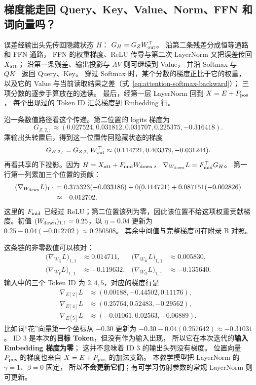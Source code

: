 \subsection{梯度能走回 Query、Key、Value、Norm、FFN 和词向量吗？}
\label{sec:gradient-paths}

误差经输出头先传回隐藏状态 $H$：
$G_H=G_ZW_{\rm out}^\top$。
沿第二条残差分成恒等通路和 FFN 通路，
FFN 的权重梯度、ReLU 传导与第二次 LayerNorm
又把误差传回 $X_{\rm att}$；
沿第一条残差、输出投影与 $AV$ 则可继续到 Value，
并沿 Softmax 与 $QK^\top$ 返回 Query、Key。
穿过 Softmax 时，某个分数的梯度正比于它的权重，
以及它的 Value 与当前读取结果之差（式~\eqref{eq:attention-softmax-backward}）；
三项分数的逐步手算放在的选读。
最后，经第一层 LayerNorm 回到 $X=E+P_{\rm pos}$，
每个出现过的 Token ID 汇总梯度到 Embedding 行。

沿一条数值路径看这个传递。第二位置的 logits 梯度为
\[
G_{Z,2,:}\approx(0.027524,0.031812,0.031707,0.225375,-0.316418).
\]
乘输出头转置后，得到这一位置传回隐藏状态的梯度
\[
G_{H,2,:}=G_{Z,2,:}W_{\rm out}^{\top}
\approx(0.114721,0.403379,-0.031244).
\]
再看共享的下投影。因为 $H=X_{\rm att}+F_{\rm mid}W_{\rm down}$，
$\nabla_{W_{\rm down}}L=F_{\rm mid}^{\top}G_H$。
第一行第一列累加三个位置的贡献：
\[
\begin{aligned}
(\nabla_{W_{\rm down}}L)_{1,1}
&=0.375323(-0.033186)+0(0.114721)+0.087151(-0.002826)\\
&\approx-0.012702.
\end{aligned}
\]
这里的 $F_{\rm mid}$ 已经过 ReLU；第二位置该列为零，因此该位置不给这项权重贡献梯度。初值 $(W_{\rm down})_{1,1}=0.25$，以 $\eta=0.04$ 更新为
$0.25-0.04(-0.012702)\approx0.250508$。
其余中间值与完整梯度可在附录 B 对照。

这条链的非零数值可以核对：
\[
\begin{aligned}
\bigl(\nabla_{W_Q}L\bigr)_{1,1}&\approx 0.014711,&
\bigl(\nabla_{W_K}L\bigr)_{1,1}&\approx 0.005830,\\
\bigl(\nabla_{W_V}L\bigr)_{1,1}&\approx-0.119632,&
\bigl(\nabla_{W_O}L\bigr)_{1,1}&\approx-0.135640.
\end{aligned}
\]
输入中的三个 Token ID 为 $2,4,5$，对应的梯度行是
\[
\begin{aligned}
\nabla_{E[2]}L&\approx(0.00188,-0.44502,0.11176),\\
\nabla_{E[4]}L&\approx(0.25764,0.52483,-0.29562),\\
\nabla_{E[5]}L&\approx(-0.01061,0.02563,-0.06889).
\end{aligned}
\]
比如词“花”向量第一个坐标从 $-0.30$
更新为 $-0.30-0.04(0.257642)\approx-0.31031$。
ID 3 是本次的\textbf{目标 Token}，但没有作为输入出现，
所以它在本次迭代的\textbf{输入 Embedding 梯度为零}；
这并不意味着 ID 3 的输出头列没有梯度。
位置向量 $P_{\rm pos}$ 的梯度也来自 $X=E+P_{\rm pos}$ 的加法支路。
本教学模型把 LayerNorm 的 $\gamma=1$、$\beta=0$ 固定，
所以\textbf{不会更新它们}；有可学习仿射参数的常规 LayerNorm 则可更新。

